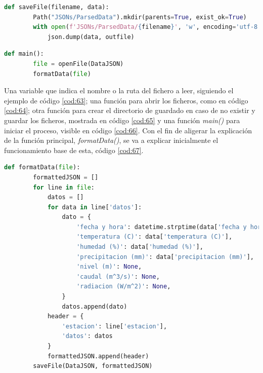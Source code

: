 \begin{lstlisting}[language=Python, caption={Declaración función \textit{saveFile()}}, label=cod:65]
	def saveFile(filename, data):
		Path("JSONs/ParsedData").mkdir(parents=True, exist_ok=True)
		with open(f'JSONs/ParsedData/{filename}', 'w', encoding='utf-8') as outfile:
			json.dump(data, outfile)
\end{lstlisting}

\begin{lstlisting}[language=Python, caption={Declaración función \textit{main()}}, label=cod:66]
	def main():
		file = openFile(DataJSON)
		formatData(file)
\end{lstlisting}

Una variable que indica el nombre o la ruta del fichero a leer, siguiendo el ejemplo de código \ref{cod:63}; una función para abrir los ficheros, como en código \ref{cod:64}; otra función para crear el directorio de guardado en caso de no existir y guardar los ficheros, mostrada en código \ref{cod:65} y una función \textit{main()} para iniciar el proceso, visible en código \ref{cod:66}. Con el fin de aligerar la explicación de la función principal, \textit{formatData()}, se va a explicar inicialmente el funcionamiento base de esta, código \ref{cod:67}.

\begin{lstlisting}[language=Python, caption={Declaración función base \textit{formatData()}, concretamente esta versión es usada para formatear los datos de Aemet}, label=cod:67]
	def formatData(file):
		formattedJSON = []
		for line in file:
			datos = []
			for data in line['datos']:
				dato = {
					'fecha y hora': datetime.strptime(data['fecha y hora'], "%d/%m/%Y %H:%M:%S").strftime("%Y-%m-%d %H:%M"),
					'temperatura (C)': data['temperatura (C)'],
					'humedad (%)': data['humedad (%)'],
					'precipitacion (mm)': data['precipitacion (mm)'],
					'nivel (m)': None,
					'caudal (m^3/s)': None,
					'radiacion (W/m^2)': None,
				}
				datos.append(dato)
			header = {
				'estacion': line['estacion'],
				'datos': datos
			}
			formattedJSON.append(header)
		saveFile(DataJSON, formattedJSON)
\end{lstlisting}

